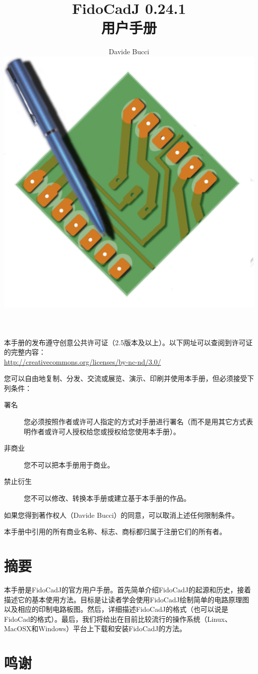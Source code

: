 \documentclass[10pt,a4paper,twoside]{scrreprt}
\title{\Huge\color{webbrown} FidoCadJ 0.24.1 \\ 用户手册}
\author{Davide Bucci\\[3em]
\includegraphics[width=.7\textwidth]{icona_fidocadj_a}
}
\begin{document}

\maketitle 

\clearpage{}

本手册的发布遵守创意公共许可证（2.5版本及以上）。以下网址可以查阅到许可证的完整内容：\\ \href{http://creativecommons.org/licenses/by-nc-nd/3.0/}{http://creativecommons.org/licenses/by-nc-nd/3.0/}

您可以自由地复制、分发、交流或展览、演示、印刷并使用本手册，但必须接受下列条件：
\begin{description}
\item [{署名}] {您必须按照作者或许可人指定的方式对手册进行署名（而不是用其它方式表明作者或许可人授权给您或授权给您使用本手册）。} 
\item [{非商业}] {您不可以把本手册用于商业。} 
\item [{禁止衍生}] {您不可以修改、转换本手册或建立基于本手册的作品。} 
\end{description}
如果您得到著作权人（Davide Bucci）的同意，可以取消上述任何限制条件。

\vfill{}
本手册中引用的所有商业名称、标志、商标都归属于注册它们的所有者。



\clearpage{}
\chapter*{摘要}

本手册是FidoCadJ的官方用户手册。首先简单介绍FidoCadJ的起源和历史，接着描述它的基本使用方法。目标是让读者学会使用FidoCadJ绘制简单的电路原理图以及相应的印制电路板图。然后，详细描述FidoCadJ的格式（也可以说是FidoCad的格式）。最后，我们将给出在目前比较流行的操作系统（Linux、MacOSX和Windows）平台上下载和安装FidoCadJ的方法。


\clearpage{}
\chapter*{鸣谢}
\end{document}
